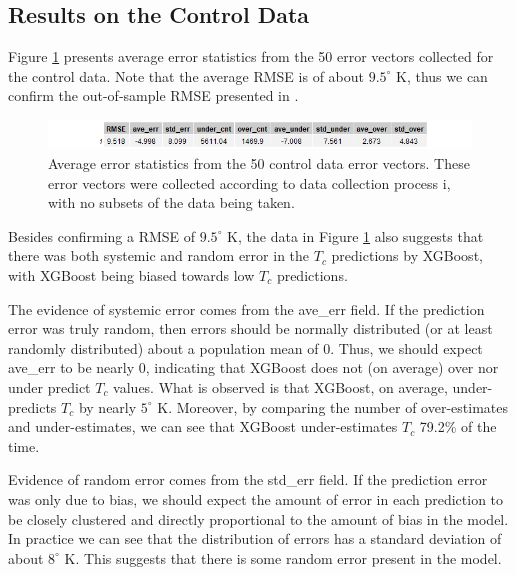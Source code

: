 \documentclass[oneside,12pt]{amsart}
\begin{document}
 \subsection{Results on the Control Data}
  Figure \ref{fig:control_table} presents average error statistics from the 50 error vectors collected for the control data. Note that the average RMSE is of about $9.5^\circ$ K, thus we can confirm the out-of-sample RMSE presented in \cite{hamidieh_data-driven_2018}.
 
 \begin{figure}[h]
     \centering
     \includegraphics[width = \linewidth]{control_tbl.png}
     \caption{Average error statistics from the 50 control data error vectors. These error vectors were collected according to data collection process i, with no subsets of the data being taken.}
     \label{fig:control_table}
 \end{figure}

Besides confirming a RMSE of $9.5^\circ$ K, the data in Figure \ref{fig:control_table} also suggests that there was both systemic and random error in the $T_c$ predictions by XGBoost, with XGBoost being biased towards low $T_c$ predictions.

The evidence of systemic error comes from the ave\_err field. If the prediction error was truly random, then errors should be normally distributed (or at least randomly distributed) about a population mean of 0. Thus, we should expect ave\_err to be nearly 0, indicating that XGBoost does not (on average) over nor under predict $T_c$ values. What is observed is that XGBoost, on average, under-predicts $T_c$ by nearly $5^\circ$ K. Moreover, by comparing the number of over-estimates and under-estimates, we can see that XGBoost under-estimates $T_c$ 79.2\% of the time.

Evidence of random error comes from the std\_err field. If the prediction error was only due to bias, we should expect the amount of error in each prediction to be closely clustered and directly proportional to the amount of bias in the model. In practice we can see that the distribution of errors has a standard deviation of about $8^\circ$ K. This suggests that there is some random error present in the model.
\end{document}
